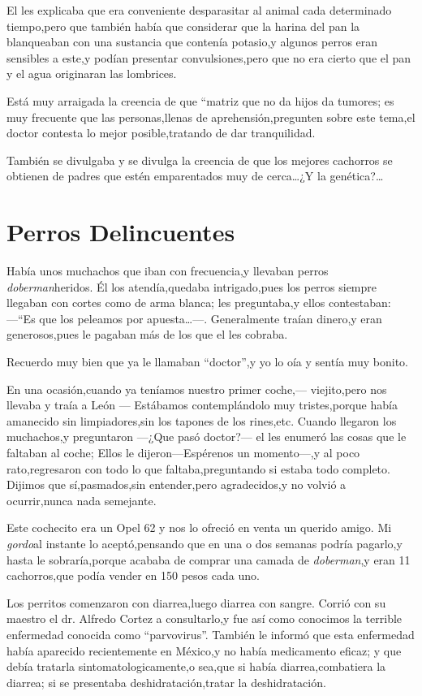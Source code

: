 \documentclass[letterpaper,12pt]{book}
\begin{document}
El les explicaba que era conveniente desparasitar al animal cada determinado tiempo,pero que también había que considerar que la harina del pan la blanqueaban con una sustancia que contenía potasio,y algunos perros eran sensibles a este,y podían presentar convulsiones,pero que no era cierto que el pan y el agua originaran las lombrices.

Está muy arraigada la creencia de que ``matriz que no da hijos da tumores; es muy frecuente que las personas,llenas de aprehensión,pregunten sobre este tema,el doctor contesta lo mejor posible,tratando de dar tranquilidad. 

También se divulgaba y se divulga la creencia de que los mejores cachorros se obtienen de padres que estén emparentados muy de cerca\ldots¿Y la genética?\ldots

\chapter{Perros Delincuentes}
Había unos muchachos que iban con frecuencia,y llevaban perros {\it doberman}\/heridos. Él los atendía,quedaba intrigado,pues los perros siempre llegaban con cortes como de arma blanca; les preguntaba,y ellos contestaban:---``Es que los peleamos por apuesta\ldots---. Generalmente traían dinero,y eran generosos,pues le pagaban más de los que el les cobraba.

Recuerdo muy bien que ya le llamaban ``doctor'',y yo lo oía y sentía muy bonito.

En una ocasión,cuando ya teníamos nuestro primer coche,--- viejito,pero nos llevaba y traía a León --- Estábamos contemplándolo muy tristes,porque había amanecido sin limpiadores,sin los tapones de los rines,etc. Cuando llegaron los muchachos,y preguntaron ---¿Que pasó doctor?--- el les enumeró las cosas que le faltaban al coche; Ellos le dijeron---Espérenos un momento---,y al poco rato,regresaron con todo lo que faltaba,preguntando si estaba todo completo. Dijimos que sí,pasmados,sin entender,pero agradecidos,y no volvió a ocurrir,nunca nada semejante.

Este cochecito era un Opel 62 y nos lo ofreció en venta un querido amigo. Mi {\it gordo}\/al instante lo aceptó,pensando que en una o dos semanas podría pagarlo,y hasta le sobraría,porque acababa de comprar una camada de {\it doberman},y eran 11 cachorros,que podía vender en 150 pesos cada uno. 

Los perritos comenzaron con diarrea,luego diarrea con sangre. Corrió con su maestro el dr. Alfredo Cortez a consultarlo,y fue así como conocimos la terrible enfermedad conocida como ``parvovirus''. También le informó que esta enfermedad había aparecido recientemente en México,y no había medicamento eficaz; y que debía tratarla sintomatologicamente,o sea,que si había diarrea,combatiera la diarrea; si se presentaba deshidratación,tratar la deshidratación.
\end{document}
